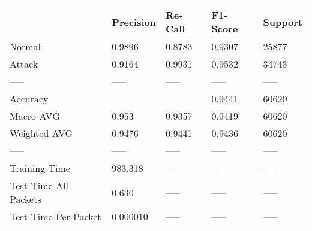 \begin{tabular}{lllll}
\toprule
{} & Precision & Re-Call & F1-Score & Support \\
\midrule
Normal                &    0.9896 &  0.8783 &   0.9307 &   25877 \\
Attack                &    0.9164 &  0.9931 &   0.9532 &   34743 \\
-----                 &     ----- &   ----- &    ----- &   ----- \\
Accuracy              &           &         &   0.9441 &   60620 \\
Macro AVG             &     0.953 &  0.9357 &   0.9419 &   60620 \\
Weighted AVG          &    0.9476 &  0.9441 &   0.9436 &   60620 \\
-----                 &     ----- &   ----- &    ----- &   ----- \\
Training Time         &   983.318 &   ----- &    ----- &   ----- \\
Test Time-All Packets &     0.630 &   ----- &    ----- &   ----- \\
Test Time-Per Packet  &  0.000010 &   ----- &    ----- &   ----- \\
\bottomrule
\end{tabular}
